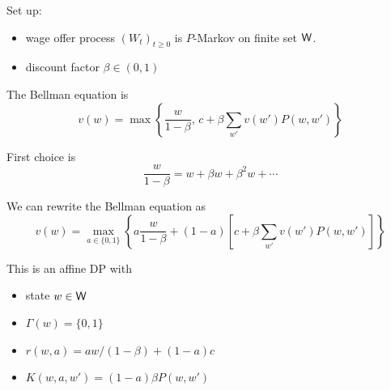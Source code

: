 \documentclass[dvipsnames]{beamer}
\begin{document}
\begin{frame}
    
    \Eg {}

    \medskip
    Set up:
    \begin{itemize}
        \item wage offer process $(W_t)_{t \geq 0}$ is $P$-Markov on finite set
            $\mathsf W$. 
        \vspace{0.5em}
        \item discount factor $\beta \in (0,1)$
    \end{itemize}

        \vspace{0.5em}
        \vspace{0.5em}
    The Bellman equation is
    \begin{equation*}
        v(w) =
        \max
        \left\{
            \frac{w}{1-\beta} , \,   c + \beta \sum_{w'} v(w') P(w, w')
        \right\}
    \end{equation*}

    First choice is
    \begin{equation*}
        \frac{w}{1-\beta} = w + \beta w + \beta^2 w + \cdots
    \end{equation*}

\end{frame}


\begin{frame}
    
    We can rewrite the Bellman equation as
    \begin{equation*}
        v(w) =
        \max_{a \in \{0,1\}}
        \left\{
             a \frac{w}{1-\beta}  
             + (1-a) \left[ c + \beta \sum_{w'} v(w') P(w, w') \right]
        \right\}
    \end{equation*}
    \medskip

    This is an affine DP with 
    \begin{itemize}
        \item state $w \in \mathsf W$
        \medskip
        \item $\Gamma(w) = \{0, 1\}$
        \medskip
        \item $r(w, a) = a w / (1-\beta) + (1-a)c$
        \medskip
        \item $K(w, a, w') = (1 - a) \beta P(w, w')$
    \end{itemize}

\end{frame}
\end{document}
